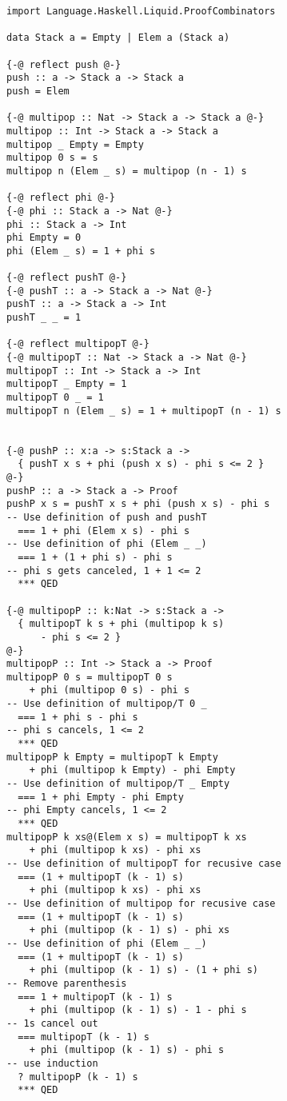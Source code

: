 \documentclass[sigplan,screen,review,anonymous]{acmart}
\begin{document}
\begin{lstlisting}
import Language.Haskell.Liquid.ProofCombinators

data Stack a = Empty | Elem a (Stack a)

{-@ reflect push @-}
push :: a -> Stack a -> Stack a
push = Elem

{-@ multipop :: Nat -> Stack a -> Stack a @-}
multipop :: Int -> Stack a -> Stack a
multipop _ Empty = Empty
multipop 0 s = s
multipop n (Elem _ s) = multipop (n - 1) s

{-@ reflect phi @-}
{-@ phi :: Stack a -> Nat @-}
phi :: Stack a -> Int
phi Empty = 0
phi (Elem _ s) = 1 + phi s

{-@ reflect pushT @-}
{-@ pushT :: a -> Stack a -> Nat @-}
pushT :: a -> Stack a -> Int
pushT _ _ = 1

{-@ reflect multipopT @-}
{-@ multipopT :: Nat -> Stack a -> Nat @-}
multipopT :: Int -> Stack a -> Int
multipopT _ Empty = 1
multipopT 0 _ = 1
multipopT n (Elem _ s) = 1 + multipopT (n - 1) s


{-@ pushP :: x:a -> s:Stack a ->
  { pushT x s + phi (push x s) - phi s <= 2 }
@-}
pushP :: a -> Stack a -> Proof
pushP x s = pushT x s + phi (push x s) - phi s
-- Use definition of push and pushT
  === 1 + phi (Elem x s) - phi s
-- Use definition of phi (Elem _ _)
  === 1 + (1 + phi s) - phi s
-- phi s gets canceled, 1 + 1 <= 2
  *** QED

{-@ multipopP :: k:Nat -> s:Stack a ->
  { multipopT k s + phi (multipop k s)
      - phi s <= 2 }
@-}
multipopP :: Int -> Stack a -> Proof
multipopP 0 s = multipopT 0 s
    + phi (multipop 0 s) - phi s
-- Use definition of multipop/T 0 _
  === 1 + phi s - phi s
-- phi s cancels, 1 <= 2
  *** QED
multipopP k Empty = multipopT k Empty
    + phi (multipop k Empty) - phi Empty
-- Use definition of multipop/T _ Empty
  === 1 + phi Empty - phi Empty
-- phi Empty cancels, 1 <= 2
  *** QED
multipopP k xs@(Elem x s) = multipopT k xs
    + phi (multipop k xs) - phi xs
-- Use definition of multipopT for recusive case
  === (1 + multipopT (k - 1) s)
    + phi (multipop k xs) - phi xs
-- Use definition of multipop for recusive case
  === (1 + multipopT (k - 1) s)
    + phi (multipop (k - 1) s) - phi xs
-- Use definition of phi (Elem _ _)
  === (1 + multipopT (k - 1) s)
    + phi (multipop (k - 1) s) - (1 + phi s)
-- Remove parenthesis
  === 1 + multipopT (k - 1) s
    + phi (multipop (k - 1) s) - 1 - phi s
-- 1s cancel out
  === multipopT (k - 1) s
    + phi (multipop (k - 1) s) - phi s
-- use induction
  ? multipopP (k - 1) s
  *** QED
\end{lstlisting}
\end{document}
